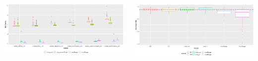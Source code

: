 \documentclass[20pt,margin=1in,innermargin=-4.5in,blockverticalspace=-0.25in]{tikzposter}
\begin{document}
\begin{columns}
{        \begin{center}
        \vspace{-1em}
        \begin{tikzfigure}[]
            \includegraphics[width=1\linewidth]{plot_comp_time.png}
        \end{tikzfigure}
        \end{center}
       
        \vspace{-2em}

        \begin{center}
        \vspace{-0.5em}
        \begin{tikzfigure}[]
            \includegraphics[width=1\linewidth]{plot_coverage.png}
        \end{tikzfigure}
        \end{center}
        
        \vspace{-1em}

    }
  

\end{columns}
\end{document}
